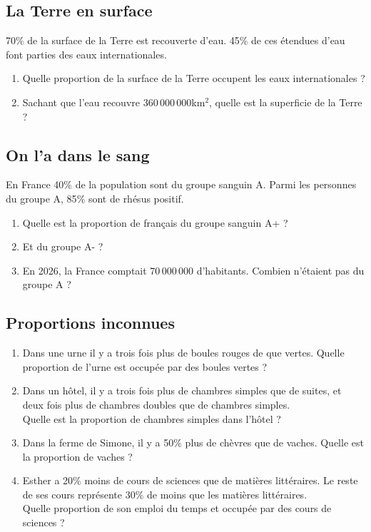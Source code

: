 \documentclass[oneside,12pt]{article}          %
\begin{document}
\subsection{La Terre en surface}
70$\%$ de la surface de la Terre est recouverte d'eau. 45$\%$ de ces étendues d'eau font parties des eaux internationales.
\begin{enumerate}
    \item Quelle proportion de la surface de la Terre occupent les eaux internationales ?
    \item  Sachant que l'eau recouvre 360\,000\,000km$^2$, quelle est la superficie de la Terre ?
\end{enumerate}



\subsection{On l'a dans le sang}
En France 40$\%$ de la population sont du groupe sanguin A. Parmi les personnes du groupe A, 85$\%$ sont de rhésus positif.
\begin{enumerate}
    \item Quelle est la proportion de français du groupe sanguin A+ ?
    \item Et du groupe A- ?
    \item En 2026, la France comptait 70\,000\,000 d'habitants. Combien n'étaient pas du groupe A ? 
\end{enumerate}



\subsection{Proportions inconnues}
\begin{enumerate}
    \item Dans une urne il y a trois fois plus de boules rouges de que vertes. Quelle proportion de l'urne est occupée par des boules vertes ?
    \item Dans un hôtel, il y a trois fois plus de chambres simples que de suites, et deux fois plus de chambres doubles que de chambres simples.\\
    Quelle est la proportion de chambres simples dans l'hôtel ?
    \item Dans la ferme de Simone, il y a 50$\%$ plus de chèvres que de vaches. Quelle est la proportion de vaches ?
    \item Esther a 20$\%$ moins de cours de sciences que de matières littéraires. Le reste de ses cours représente 30$\%$ de moins que les matières littéraires.\\
    Quelle proportion de son emploi du temps et occupée par des cours de sciences ?
\end{enumerate}
\end{document}

